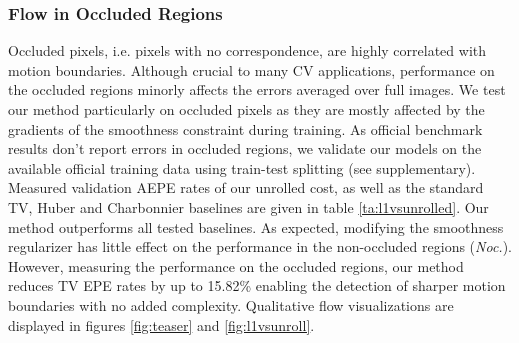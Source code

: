 \documentclass[10pt,twocolumn,letterpaper]{article}
\begin{document}
\subsubsection{Flow in Occluded Regions}
Occluded pixels, i.e. pixels with no correspondence, are highly correlated with motion boundaries. Although crucial to many CV applications, performance on the occluded regions minorly affects the errors averaged over full images. 
We test our method particularly on occluded pixels as they are mostly affected by the gradients of the smoothness constraint during training. As official benchmark results don't report errors in occluded regions, we validate our models on the available official training data using train-test splitting (see supplementary). 
Measured validation AEPE rates of our unrolled cost, as well as the standard TV, Huber \cite{huber1964robust} and Charbonnier \cite{charbonnier1997deterministic} baselines are given in table \ref{ta:l1vsunrolled}. Our method outperforms all tested baselines. As expected, modifying the smoothness regularizer has little effect on the performance in the non-occluded regions (\emph{Noc.}). However, measuring the performance on the occluded regions, our method reduces TV EPE rates by up to 15.82\% enabling the detection of sharper motion boundaries with no added complexity.
Qualitative flow visualizations are displayed in figures \ref{fig:teaser} and \ref{fig:l1vsunroll}.
\end{document}
